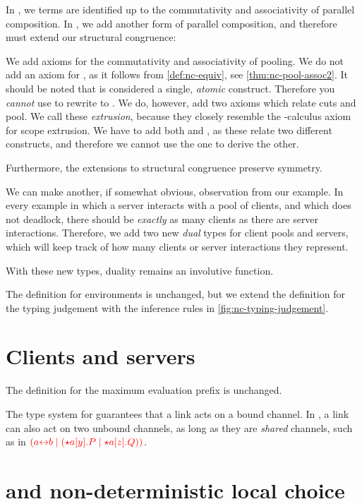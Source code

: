 In \rcp, we terms are identified up to the commutativity and associativity of
parallel composition. In \nodcap, we add another form of parallel composition,
and therefore must extend our structural congruence:

We add axioms for the commutativity and associativity of pooling.
We do not add an axiom for , as it follows from
\cref{def:nc-equiv}, see \cref{thm:nc-pool-assoc2}.
It should be noted that  is considered a single,
\emph{atomic} construct.
Therefore you \emph{cannot} use  to rewrite
 to .
We do, however, add two axioms which relate cuts and pool.
We call these \emph{extrusion}, because they closely resemble the
\textpi-calculus axiom for scope extrusion. 
We have to add both  and , as these relate two
different constructs, and therefore we cannot use the one to derive the other.

Furthermore, the extensions to structural congruence preserve symmetry.

We can make another, if somewhat obvious, observation from our example.
In every example in which a server interacts with a pool of clients, and which
does not deadlock, there should be \emph{exactly} as many clients as there are
server interactions.
Therefore, we add two new \emph{dual} types for client pools and servers, which
will keep track of how many clients or server interactions they represent.


With these new types, duality remains an involutive function.

The definition for environments is unchanged, but we extend the definition for
the typing judgement with the inference rules in \cref{fig:nc-typing-judgement}.





\section{Clients and servers}\label{sec:nc-clients-and-servers}






The definition for the maximum evaluation prefix is unchanged.

The type system for \cp guarantees that a link acts on a bound channel. In
\nodcap, a link can also act on two unbound channels, as long as they are
\emph{shared} channels, such as in
$\textcolor{red}{(a{\leftrightarrow}b \mid ({\star}{a}[y].P \mid {\star}{a}[z].Q))}$.








\section{\nodcap and non-deterministic local choice}
